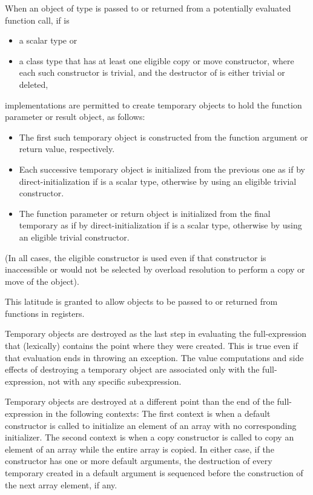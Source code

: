 \pnum
When an object of type 
is passed to or returned from a potentially evaluated function call,
if  is
\begin{itemize}
\item
a scalar type or
\item
a class type that
has at least one eligible copy or move constructor,
where each such constructor is trivial,
and the destructor of  is either trivial or deleted,
\end{itemize}
implementations are permitted
to create temporary objects
to hold the function parameter or result object,
as follows:
\begin{itemize}
\item
The first such temporary object
is constructed from the function argument or return value, respectively.
\item
Each successive temporary object
is initialized from the previous one
as if by direct-initialization if  is a scalar type,
otherwise by using an eligible trivial constructor.
\item
The function parameter or return object is initialized
from the final temporary
as if by direct-initialization if  is a scalar type,
otherwise by using an eligible trivial constructor.
\end{itemize}
(In all cases, the eligible constructor is used
even if that constructor is inaccessible
or would not be selected by overload resolution
to perform a copy or move of the object).
\begin{note}
This latitude is granted to allow objects
to be passed to or returned from functions in registers.
\end{note}

\pnum
{}%
%
%
Temporary objects are destroyed as the last step
in evaluating
the full-expression
that (lexically) contains the point where
they were created.
This is true even if that evaluation ends in throwing an exception.
The
%
value computations and
%
side effects of destroying a temporary object
are associated only with the full-expression, not with any specific
subexpression.

\pnum
{}%
%
Temporary objects are destroyed at a different point
than the end of the full-expression in the following contexts:
The first context is when a default constructor is called to initialize
an element of an array with no corresponding initializer.
The second context is when a copy constructor is called to copy an element of
an array while the entire array is copied.
In either case, if the constructor has one or more default arguments,
the destruction of every temporary created in a default argument is
sequenced before the construction of the next array element, if any.

